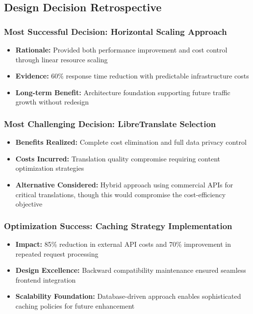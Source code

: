 
\subsection{Design Decision Retrospective}

\subsubsection{Most Successful Decision: Horizontal Scaling Approach}
\begin{itemize}
    \item \textbf{Rationale:} Provided both performance improvement and cost control through linear resource scaling
    \item \textbf{Evidence:} 60\% response time reduction with predictable infrastructure costs
    \item \textbf{Long-term Benefit:} Architecture foundation supporting future traffic growth without redesign
\end{itemize}

\subsubsection{Most Challenging Decision: LibreTranslate Selection}
\begin{itemize}
    \item \textbf{Benefits Realized:} Complete cost elimination and full data privacy control
    \item \textbf{Costs Incurred:} Translation quality compromise requiring content optimization strategies
    \item \textbf{Alternative Considered:} Hybrid approach using commercial APIs for critical translations, though this would compromise the cost-efficiency objective
\end{itemize}

\subsubsection{Optimization Success: Caching Strategy Implementation}
\begin{itemize}
    \item \textbf{Impact:} 85\% reduction in external API costs and 70\% improvement in repeated request processing
    \item \textbf{Design Excellence:} Backward compatibility maintenance ensured seamless frontend integration
    \item \textbf{Scalability Foundation:} Database-driven approach enables sophisticated caching policies for future enhancement
\end{itemize}

